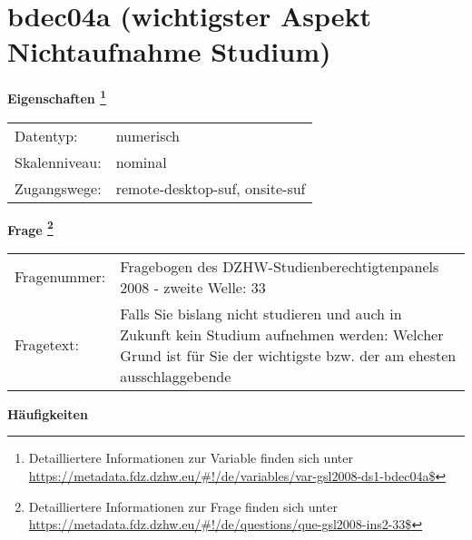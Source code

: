 
    \setcounter{footnote}{0}

    \vspace*{-1.8cm}
	\section{bdec04a (wichtigster Aspekt Nichtaufnahme Studium)}
	\label{section:bdec04a}



    \vspace*{0.5cm}
    \noindent\textbf{Eigenschaften
	\footnote{Detailliertere Informationen zur Variable finden sich unter
		\url{https://metadata.fdz.dzhw.eu/\#!/de/variables/var-gsl2008-ds1-bdec04a$}}}\\
	\begin{tabularx}{\hsize}{@{}lX}
	Datentyp: & numerisch \\
	Skalenniveau: & nominal \\
	Zugangswege: &
	  remote-desktop-suf, 
	  onsite-suf
 \\
    \end{tabularx}



				\vspace*{0.5cm}
                \noindent\textbf{Frage
	                \footnote{Detailliertere Informationen zur Frage finden sich unter
		              \url{https://metadata.fdz.dzhw.eu/\#!/de/questions/que-gsl2008-ins2-33$}}}\\
				\begin{tabularx}{\hsize}{@{}lX}
					Fragenummer: &
					  Fragebogen des DZHW-Studienberechtigtenpanels 2008 - zweite Welle:
					  33
 \\
					Fragetext: & Falls Sie bislang nicht studieren und auch in Zukunft kein Studium aufnehmen werden: Welcher Grund ist für Sie der wichtigste bzw. der am ehesten ausschlaggebende \\
				\end{tabularx}





        		\vspace*{0.5cm}
                \noindent\textbf{Häufigkeiten}

